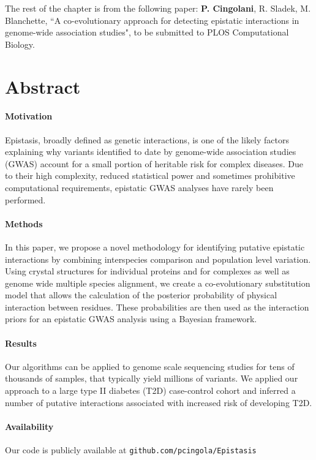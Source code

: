 The rest of the chapter is from the following paper: \textbf{P. Cingolani}, R. Sladek, M. Blanchette, ``A co-evolutionary approach for detecting epistatic interactions in genome-wide association studies", to be submitted to PLOS Computational Biology.

\section{Abstract}

\paragraph{Motivation} Epistasis, broadly defined as genetic interactions, is one of the likely factors explaining why variants identified to date by genome-wide association studies (GWAS) account for a small portion of heritable risk for complex diseases. Due to their high complexity, reduced statistical power and sometimes prohibitive computational requirements, epistatic GWAS analyses have rarely been performed. 

\paragraph{Methods} In this paper, we propose a novel methodology for identifying putative epistatic interactions by combining interspecies comparison and population level variation. 
Using crystal structures for individual proteins and for complexes as well as genome wide multiple species alignment, we create a co-evolutionary substitution model that allows the calculation of the posterior probability of physical interaction between residues. 
These probabilities are then used as the interaction priors for an epistatic GWAS analysis using a Bayesian framework. 

\paragraph{Results} Our algorithms can be applied to genome scale sequencing studies for tens of thousands of samples, that typically yield millions of variants. 
We applied our approach to a large type II diabetes (T2D) case-control cohort and inferred a number of putative interactions associated with increased risk of developing T2D. 

\paragraph{Availability} Our code is publicly available at \texttt{github.com/pcingola/Epistasis}

